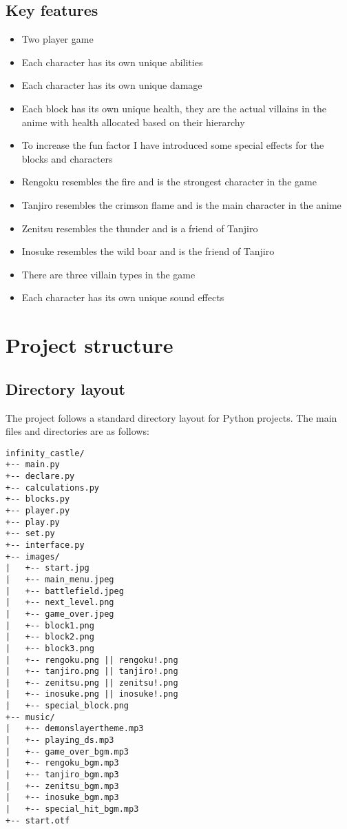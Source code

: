 \documentclass[12pt]{article}
\begin{document}
\subsection{Key features}
\begin{itemize}
    \item Two player game
    \item Each character has its own unique abilities
    \item Each character has its own unique damage
    \item Each block has its own unique health, they are the actual villains in the anime with health allocated based on their hierarchy
    \item To increase the fun factor I have introduced some special effects for the blocks and characters
    \item Rengoku resembles the fire and is the strongest character in the game
    \item Tanjiro resembles the crimson flame and is the main character in the anime
    \item Zenitsu resembles the thunder and is a friend of Tanjiro
    \item Inosuke resembles the wild boar and is the friend of Tanjiro
    \item There are three villain types in the game
    \item Each character has its own unique sound effects 
\end{itemize}

\section{Project structure}
\subsection{Directory layout}
The project follows a standard directory layout for Python projects. The main files and directories are as follows:

\begin{verbatim}
infinity_castle/
+-- main.py
+-- declare.py
+-- calculations.py
+-- blocks.py
+-- player.py
+-- play.py
+-- set.py
+-- interface.py
+-- images/
|   +-- start.jpg
|   +-- main_menu.jpeg
|   +-- battlefield.jpeg
|   +-- next_level.png
|   +-- game_over.jpeg
|   +-- block1.png
|   +-- block2.png
|   +-- block3.png
|   +-- rengoku.png || rengoku!.png
|   +-- tanjiro.png || tanjiro!.png
|   +-- zenitsu.png || zenitsu!.png
|   +-- inosuke.png || inosuke!.png
|   +-- special_block.png
+-- music/
|   +-- demonslayertheme.mp3
|   +-- playing_ds.mp3
|   +-- game_over_bgm.mp3
|   +-- rengoku_bgm.mp3
|   +-- tanjiro_bgm.mp3
|   +-- zenitsu_bgm.mp3
|   +-- inosuke_bgm.mp3
|   +-- special_hit_bgm.mp3
+-- start.otf
\end{verbatim}
\end{document}
